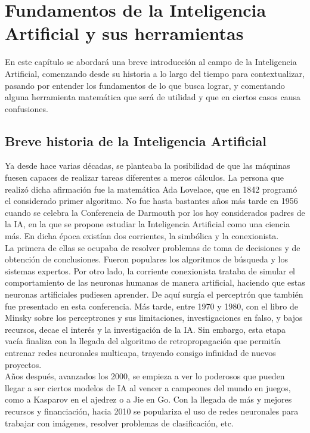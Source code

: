 \chapter{Fundamentos de la Inteligencia Artificial y sus herramientas}

	En este capítulo se abordará una breve introducción al campo de la Inteligencia Artificial, comenzando desde su historia a lo largo del tiempo para contextualizar, pasando por entender los fundamentos de lo que busca lograr, y comentando alguna herramienta matemática que será de utilidad y que en ciertos casos causa confusiones. 

	\section{Breve historia de la Inteligencia Artificial}
	
		Ya desde hace varias décadas, se planteaba la posibilidad de que las máquinas fuesen capaces de realizar tareas diferentes a meros cálculos. La persona que realizó dicha afirmación fue la matemática Ada Lovelace, que en 1842 programó el considerado primer algoritmo. No fue hasta bastantes años más tarde en 1956 cuando se celebra la Conferencia de Darmouth por los hoy considerados padres de la IA, en la que se propone estudiar la Inteligencia Artificial como una ciencia más. En dicha época existían dos corrientes, la simbólica y la conexionista. \\
		
		La primera de ellas se ocupaba de resolver problemas de toma de decisiones y de obtención de conclusiones. Fueron populares los algoritmos de búsqueda y los sistemas expertos. Por otro lado, la corriente conexionista trataba de simular el comportamiento de las neuronas humanas de manera artificial, haciendo que estas neuronas artificiales pudiesen aprender. De aquí surgía el perceptrón que también fue presentado en esta conferencia. Más tarde, entre 1970 y 1980, con el libro de Minsky sobre los perceptrones y sus limitaciones, investigaciones en falso, y bajos recursos, decae el interés y la investigación de la IA. Sin embargo, esta etapa vacía finaliza con la llegada del algoritmo de retropropagación que permitía entrenar redes neuronales multicapa, trayendo consigo infinidad de nuevos proyectos. \\
		
		Años después, avanzados los 2000, se empieza a ver lo poderosos que pueden llegar a ser ciertos modelos de IA al vencer a campeones del mundo en juegos, como a Kasparov en el ajedrez o a Jie en Go. Con la llegada de más y mejores recursos y financiación, hacia 2010 se populariza el uso de redes neuronales para trabajar con imágenes, resolver problemas de clasificación, etc\cite{historiaIA}. \\
		
